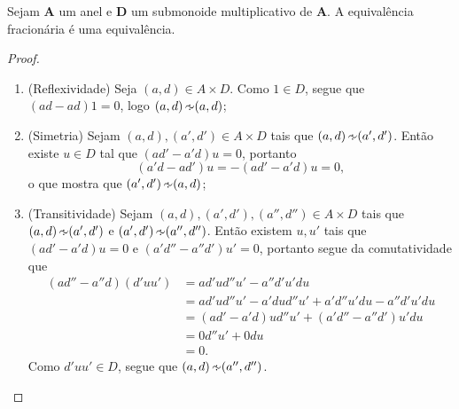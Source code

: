 \begin{proposition}
Sejam $\bm A$ um anel e $\bm D$ um submonoide multiplicativo de $\bm A$. A equivalência fracionária é uma equivalência.
\end{proposition}
\begin{proof}
	\begin{enumerate}
	\item (Reflexividade) Seja $(a,d) \in A \times D$. Como $1 \in D$, segue que $(ad-ad)1 = 0$, logo $(a,d) \simfra (a,d)$;

	\item (Simetria) Sejam $(a,d), (a',d') \in A \times D$ tais que $(a,d) \simfra (a',d')$. Então existe $u \in D$ tal que $(ad'-a'd)u = 0$, portanto
		\begin{equation*}
		(a'd-ad')u = -(ad'-a'd)u = 0,
		\end{equation*}
o que mostra que $(a',d') \simfra (a,d)$;

	\item (Transitividade) Sejam $(a,d), (a',d'),(a'',d'') \in A \times D$ tais que $(a,d) \simfra (a',d')$ e $(a',d') \simfra (a'',d'')$. Então existem $u,u'$ tais que $(ad'-a'd)u = 0$ e $(a'd''-a''d')u' = 0$, portanto segue da comutatividade que
		\begin{align*}
		(ad''-a''d)(d'uu') &= ad'ud''u' - a''d'u'du \\
			&= ad'ud''u' - a'dud''u' + a'd''u'du - a''d'u'du \\
			&= (ad' - a'd)ud''u' + (a'd'' - a''d')u'du \\
			&= 0d''u' + 0du \\
			&= 0.
		\end{align*}
Como $d'uu' \in D$, segue que $(a,d) \simfra (a'',d'')$.
	\end{enumerate}
\end{proof}

